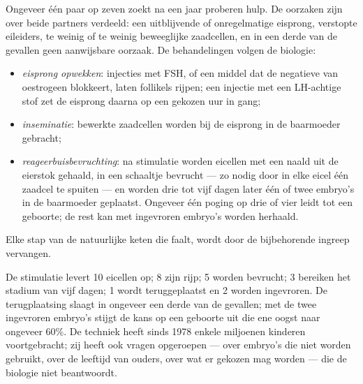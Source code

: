 \begin{proposition}\label{prop:g11:hormones-and-reproduction:art}
Ongeveer één paar op zeven zoekt na een jaar proberen hulp. De oorzaken
zijn over beide partners verdeeld: een uitblijvende of onregelmatige
eisprong, verstopte eileiders, te weinig of te weinig beweeglijke
zaadcellen, en in een derde van de gevallen geen aanwijsbare oorzaak. De
behandelingen volgen de biologie:
\begin{itemize}
  \item \emph{eisprong opwekken}: injecties met FSH, of een middel dat de
        negatieve  van oestrogeen blokkeert, laten
        follikels rijpen; een injectie met een LH-achtige stof zet de
        eisprong daarna op een gekozen uur in gang;
  \item \emph{inseminatie}: bewerkte zaadcellen worden bij de eisprong in
        de baarmoeder gebracht;
  \item \emph{reageerbuisbevruchting}: na stimulatie worden eicellen met
        een naald uit de eierstok gehaald, in een schaaltje bevrucht ---
        zo nodig door in elke eicel één zaadcel te spuiten --- en worden
        drie tot vijf dagen later één of twee embryo's in de baarmoeder
        geplaatst. Ongeveer één poging op drie of vier leidt tot een
        geboorte; de rest kan met ingevroren embryo's worden herhaald.
\end{itemize}
Elke stap van de natuurlijke keten die faalt, wordt door de bijbehorende
ingreep vervangen.
\end{proposition}
\admitted

\begin{example}\label{ex:g11:hormones-and-reproduction:ivf}
De stimulatie levert 10 eicellen op; 8 zijn rijp; 5 worden bevrucht; 3
bereiken het stadium van vijf dagen; 1 wordt teruggeplaatst en 2 worden
ingevroren. De terugplaatsing slaagt in ongeveer een derde van de
gevallen; met de twee ingevroren embryo's stijgt de kans op een geboorte
uit die ene oogst naar ongeveer 60\%. De techniek heeft sinds 1978 enkele
miljoenen kinderen voortgebracht; zij heeft ook vragen opgeroepen ---
over embryo's die niet worden gebruikt, over de leeftijd van ouders, over
wat er gekozen mag worden --- die de biologie niet beantwoordt.
\end{example}

